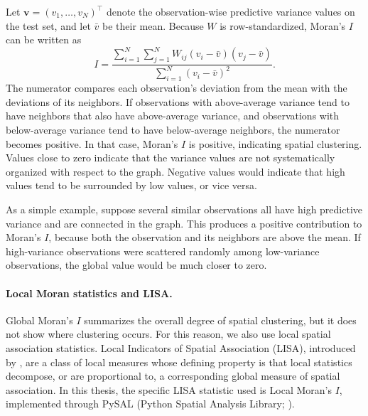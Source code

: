Let $\mathbf{v}=(v_1,\dots,v_N)^\top$ denote the observation-wise predictive variance
values on the test set, and let $\bar{v}$ be their mean. Because $W$ is row-standardized,
Moran's $I$ can be written as
\[
I =
\frac{\sum_{i=1}^N \sum_{j=1}^N W_{ij}(v_i-\bar{v})(v_j-\bar{v})}
{\sum_{i=1}^N (v_i-\bar{v})^2}.
\]
The numerator compares each observation's deviation from the mean with the deviations
of its neighbors. If observations with above-average variance tend to have neighbors that
also have above-average variance, and observations with below-average variance tend to
have below-average neighbors, the numerator becomes positive. In that case, Moran's
$I$ is positive, indicating spatial clustering. Values close to zero indicate that the
variance values are not systematically organized with respect to the graph. Negative
values would indicate that high values tend to be surrounded by low values, or vice versa.

As a simple example, suppose several similar observations all have high predictive
variance and are connected in the graph. This produces a positive contribution to Moran's
$I$, because both the observation and its neighbors are above the mean. If high-variance
observations were scattered randomly among low-variance observations, the global value
would be much closer to zero.

\paragraph{Local Moran statistics and LISA.}
\label{sec:meth-lisa}

Global Moran's $I$ summarizes the overall degree of spatial clustering, but it does not show where clustering occurs. For this reason, we also use local spatial association statistics. Local Indicators of Spatial Association (LISA), introduced by \citet{anselin1995lisa}, are a class of local measures whose defining property is that local statistics decompose, or are proportional to, a corresponding global measure of spatial association. In this thesis, the specific LISA statistic used is Local Moran's $I$, implemented through PySAL (Python Spatial Analysis Library; \citealp{rey2007pysal}).

